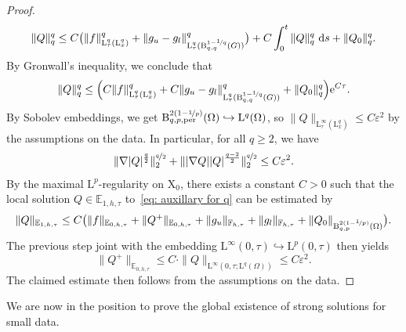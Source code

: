 \documentclass[10pt]{amsart}
\theoremstyle{plain}
\theoremstyle{definition}
\theoremstyle{thm}
\numberwithin{equation}{section}
\newcommand{\rL}{\mathrm{L}}
\newcommand{\rLq}{\rL^q}
\newcommand{\rLp}{\rL^p}
\newcommand{\rB}{\mathrm{B}}
\newcommand{\rX}{\mathrm{X}}
\newcommand{\E}{\mathbb{E}}
\newcommand{\F}{\mathbb{F}}
\newcommand{\per}{\mathrm{per}}
\newcommand{\eps}{\varepsilon}
\begin{document}
\begin{proof}
\begin{equation*}
    \| Q \|^q_q \leq C \bigl (\| f \|^q_{\rLq_\tau(\rL_x^q)} +\| g_u -g_l \|^q_{\rLq_\tau(\rB_{q,q}^{1 - \nicefrac{1}{q}}(G))}\bigr )+ C \int_0^t \| Q \|^q_q \ \mathrm{d}s + \| Q_0 \|^q_q.
\end{equation*}
By Gronwall's inequality, we conclude that
\begin{equation*}
    \| Q \|^q_q \leq \Bigl ( C  \| f \|^q_{\rLq_\tau(\rL_x^q)} +C\| g_u -g_l \|^q_{\rLq_\tau(\rB_{q,q}^{1 - \nicefrac{1}{q}}(G))} + \| Q_0 \|^q_q \Bigr ) \mathrm{e}^{C\tau}.
\end{equation*}
By Sobolev embeddings, we get $\rB^{2(1-\nicefrac{1}{p})}_{q,p,\per}(\Omega) \hookrightarrow \rLq(\Omega)$, so $\| Q\|_{\rL^\infty_\tau(\rL_x^q)} \leq C \eps^2$ by the assumptions on the data.
In particular, for all $q \geq 2$, we have 
\begin{equation*}
     \| \nabla | Q |^{\frac{q}{2}} \|^{\nicefrac{q}{2}}_2 + \| |\nabla Q|  | Q|^{\frac{q-2}{2}} \|^{\nicefrac{q}{2}}_2 \leq C \eps^2.
\end{equation*}
By the maximal $\rLp$-regularity on $\rX_0$, there exists a constant $C>0$ such that the local solution $Q \in \E_{1,h,\tau}$ to~\eqref{eq: auxillary for q} can be estimated by 
   \begin{equation*}
       \| Q \|_{\E_{1,h,\tau}} \leq C \bigl ( \| f \|_{\E_{0,h,\tau}} + \| Q^+\|_{\E_{0,h,\tau}}
       + \| g_u \|_{\F_{h,\tau}} +\| g_l \|_{\F_{h,\tau}} + \| Q_0 \|_{\rB_{q,p}^{2(1-\nicefrac{1}{p})}(\Omega)} \bigr ).
   \end{equation*}
The previous step joint with the embedding $\rL^\infty(0,\tau) \hookrightarrow \rLp(0,\tau)$ then yields
\begin{equation*}
    \| Q^+\|_{\E_{0,h,\tau}} \leq C \cdot \| Q \|_{\rL^\infty(0,\tau;\rLq(\Omega)) } \leq C\eps^2.
\end{equation*}
The claimed estimate then follows from the assumptions on the data.
\end{proof}

We are now in the position to prove the global existence of strong solutions for small data. 
\end{document}
